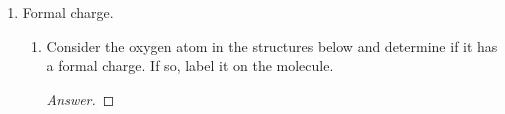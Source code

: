 \documentclass[../psets.tex]{subfiles}
\begin{document}
\begin{enumerate}
\begin{enumerate}
\begin{enumerate}
\begin{proof}[Answer]
                ${\color{white}hi}$
                \begin{center}
                \end{center}
            \end{proof}
            \item {}.
            \begin{proof}[Answer]
                Nonpolar.
            \end{proof}
        \end{enumerate}
        \item Rank the following covalent bonds in order of \emph{increasing} polarity.
        \begin{enumerate}
            \item {}, , .
            \begin{proof}[Answer]
                \begin{equation*}
                    \ce{C-H} < \ce{N-H} < \ce{O-H}
                \end{equation*}
            \end{proof}
            \item {}, , .
            \begin{proof}[Answer]
                \begin{equation*}
                    \ce{C-N} < \ce{C-O} < \ce{B-O}
                \end{equation*}
            \end{proof}
            \item {}, , .
            \begin{proof}[Answer]
                \begin{equation*}
                    \ce{C-S} < \ce{C-P} < \ce{C-N}
                \end{equation*}
            \end{proof}
        \end{enumerate}
    \end{enumerate}
    \item Formal charge.
    \begin{enumerate}
        \item Consider the oxygen atom in the structures below and determine if it has a formal charge. If so, label it on the molecule.
        \begin{proof}[Answer]

\end{proof}
\end{enumerate}
\end{enumerate}
\end{document}
